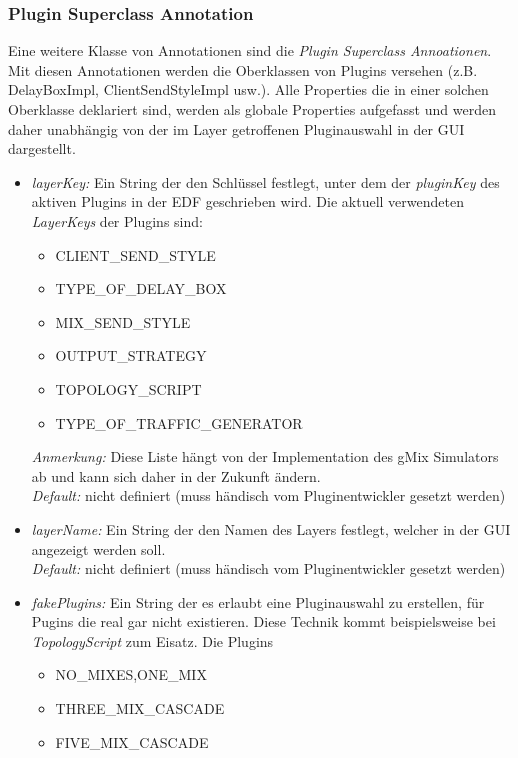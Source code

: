 \documentclass[a4paper, 11pt]{article} %
\begin{document}
\subsubsection{Plugin Superclass Annotation} %
\label{ssub:superclass_annotation}
Eine weitere Klasse von Annotationen sind die \emph{Plugin Superclass Annoationen}. 
Mit diesen Annotationen werden die Oberklassen von Plugins versehen (z.B. DelayBoxImpl, ClientSendStyleImpl usw.). Alle Properties die in einer solchen Oberklasse deklariert sind, werden als globale Properties aufgefasst und werden daher unabhängig von der im Layer getroffenen Pluginauswahl in der GUI dargestellt. 

\begin{itemize}
	\item \emph{layerKey:}
	Ein String der den Schlüssel festlegt, unter dem der \emph{pluginKey} des aktiven Plugins in der EDF geschrieben wird. Die aktuell verwendeten \emph{LayerKeys} der Plugins sind: 
	\begin{itemize}
		\item CLIENT\_SEND\_STYLE
		\item TYPE\_OF\_DELAY\_BOX
		\item MIX\_SEND\_STYLE
		\item OUTPUT\_STRATEGY
		\item TOPOLOGY\_SCRIPT 
		\item TYPE\_OF\_TRAFFIC\_GENERATOR
	\end{itemize}
	\emph{Anmerkung:} Diese Liste hängt von der Implementation des gMix Simulators ab und kann sich daher in der Zukunft ändern.\\
	\emph{Default:} nicht definiert (muss händisch vom Pluginentwickler gesetzt werden)
	\item \emph{layerName:}
	Ein String der den Namen des Layers festlegt, welcher in der GUI angezeigt werden soll.\\
	\emph{Default:} nicht definiert (muss händisch vom Pluginentwickler gesetzt werden)
	\item \emph{fakePlugins:} Ein String der es erlaubt eine Pluginauswahl zu erstellen, für Pugins die real gar nicht existieren. Diese Technik kommt beispielsweise bei \emph{TopologyScript} zum Eisatz. Die Plugins  
	\begin{itemize} 
		\item NO\_MIXES,ONE\_MIX
		\item THREE\_MIX\_CASCADE 
		\item FIVE\_MIX\_CASCADE 

\end{itemize}
\end{itemize}
\end{document}
